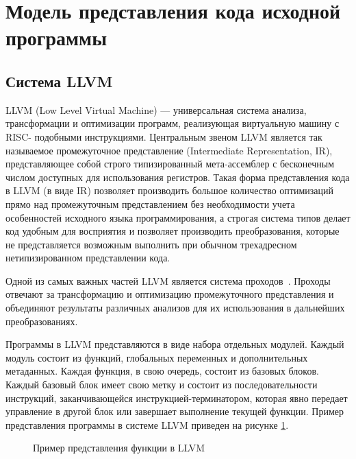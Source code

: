 \section{Модель представления кода исходной программы}

\subsection{Система LLVM}
LLVM (Low Level Virtual Machine) --- универсальная система анализа, 
трансформации и оптимизации программ, реализующая виртуальную машину с RISC-
подобными инструкциями. Центральным звеном LLVM является так называемое 
промежуточное представление (Intermediate Representation, IR), представляющее 
собой строго типизированный мета-ассемблер с бесконечным числом доступных для 
использования регистров.  Такая форма представления кода в LLVM (в виде IR) 
позволяет производить большое количество оптимизаций прямо над промежуточным 
представлением без необходимости учета особенностей исходного языка 
программирования, а строгая система типов делает код удобным для восприятия и 
позволяет производить преобразования, которые не представляется возможным 
выполнить при обычном трехадресном нетипизированном представлении кода.

Одной из самых важных частей LLVM является система проходов~\cite{llvmpass}. 
Проходы отвечают за трансформацию и оптимизацию промежуточного представления и 
объединяют результаты различных анализов для их использования в дальнейших 
преобразованиях.

Программы в LLVM представляются в виде набора отдельных модулей. Каждый модуль 
состоит из функций, глобальных переменных и дополнительных метаданных. Каждая 
функция, в свою очередь, состоит из базовых блоков. Каждый базовый блок имеет 
свою метку и состоит из последовательности инструкций, заканчивающейся 
инструкцией-терминатором, которая явно передает управление в другой блок или 
завершает выполнение текущей функции. Пример представления программы в системе 
LLVM приведен на рисунке \ref{image:llvmIR}.
\begin{figure}[h!]
\caption{Пример представления функции в LLVM}
\label{image:llvmIR}
\end{figure}
    
